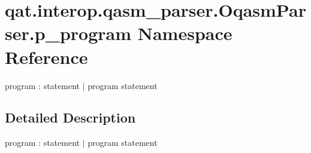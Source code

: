 \hypertarget{namespaceqat_1_1interop_1_1qasm__parser_1_1OqasmParser_1_1p__program}{\section{qat.\-interop.\-qasm\-\_\-parser.\-Oqasm\-Parser.\-p\-\_\-program Namespace Reference}
\label{namespaceqat_1_1interop_1_1qasm__parser_1_1OqasmParser_1_1p__program}
}


program \-: statement $|$ program statement  




\subsection{Detailed Description}
program \-: statement $|$ program statement 